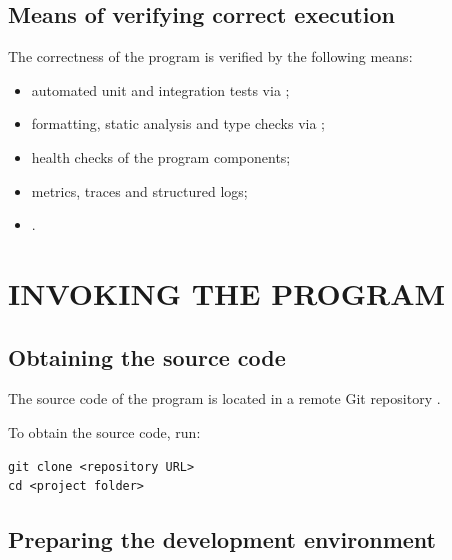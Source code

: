 \documentclass[12pt,a4paper]{extarticle}
\begin{document}
\subsection{Means of verifying correct execution}

\begin{hseExample}
The correctness of the program is verified by the following means:

\begin{itemize}[leftmargin=1.25cm]
    \item automated unit and integration tests via ;
    \item formatting, static analysis and type checks via ;
    \item health checks of the program components;
    \item metrics, traces and structured logs;
    \item {}.
\end{itemize}
\end{hseExample}

\clearpage

\section{INVOKING THE PROGRAM}

\subsection{Obtaining the source code}

\begin{hseExample}
The source code of the program is located in a remote Git repository .

To obtain the source code, run:

\begin{verbatim}
git clone <repository URL>
cd <project folder>
\end{verbatim}
\end{hseExample}

\subsection{Preparing the development environment}
\end{document}

